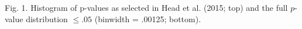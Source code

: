 Fig. 1. Histogram of p-values as selected in Head et al. (2015; top) and the full $p$-value distribution $\leq.05$ (binwidth = .00125; bottom).